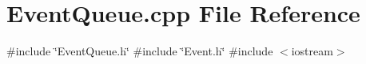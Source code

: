 \section{Event\+Queue.\+cpp File Reference}
\label{EventQueue_8cpp}
{\ttfamily \#include \char`\"{}Event\+Queue.\+h\char`\"{}}\newline
{\ttfamily \#include \char`\"{}Event.\+h\char`\"{}}\newline
{\ttfamily \#include $<$iostream$>$}\newline
